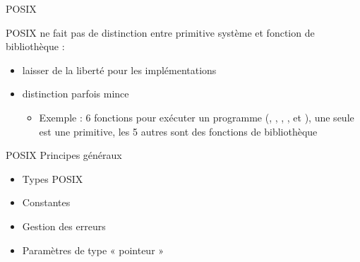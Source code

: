 \begin {frame} {POSIX}

    POSIX ne fait pas de distinction entre primitive système et fonction
    de bibliothèque :

    \begin {itemize}
	\item laisser de la liberté pour les implémentations
	\item distinction parfois mince
	    \begin {itemize}
		\item Exemple : 6 fonctions pour exécuter un programme
		    (, , ,
		    ,  et ),
		    une seule est une primitive, les 5 autres sont des
		    fonctions de bibliothèque
	    \end {itemize}
    \end {itemize}
\end {frame}

\begin {frame} {POSIX}
    Principes généraux

    \begin {itemize}
	\item Types POSIX
	\item Constantes
	\item Gestion des erreurs
	\item Paramètres de type « pointeur »
    \end {itemize}
\end {frame}

